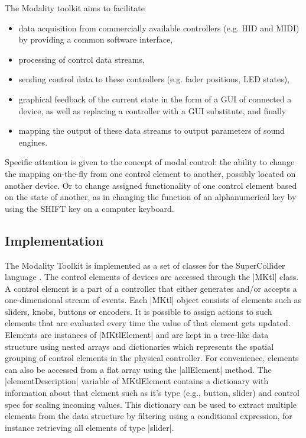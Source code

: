 \documentclass{article}
\begin{document}
The Modality toolkit aims to facilitate
\begin{itemize}
	\item data acquisition from commercially available controllers (e.g. HID and MIDI) by providing a common software interface,
	\item processing of control data streams,
	\item sending control data to these controllers (e.g. fader positions, LED states),
	\item graphical feedback  of the current state in the form of a GUI of connected a device, as well as replacing a controller with a GUI substitute, and finally
	\item mapping the output of these data streams to output parameters of sound engines.
\end{itemize}

Specific attention is given to the concept of modal control: the ability to change the mapping on-the-fly from one control element to another, possibly located on another device.
Or to change assigned functionality of one control element based on the state of another, as in changing the function of an alphanumerical key by using the SHIFT key on a computer keyboard.

\subsection{Implementation}
\label{sub:implementation}

The Modality Toolkit is implemented as a set of classes for the SuperCollider language \cite{mccartney2002-ret}. 
The control elements of devices are accessed through the |MKtl| class. 
A control element is a part of a controller that either generates and/or accepts a one-dimensional stream of events. 
Each |MKtl| object consists of elements such as sliders, knobs, buttons or encoders.
It is possible to assign actions to such elements that are evaluated every time the value of that element gets updated.
Elements are instances of |MKtlElement| and are kept in a tree-like data structure using nested arrays and dictionaries which represents the spatial grouping of control elements in the physical controller. 
For convenience, elements can also be accessed from a flat array using the |allElement| method. 
The |elementDescription| variable of MKtlElement contains a dictionary with information about that element such as it's type (e.g., button, slider) and control spec for scaling incoming values. 
This dictionary can be used to extract multiple elements from the data structure by filtering using a conditional expression, for instance retrieving all elements of type |slider|.
\end{document}
